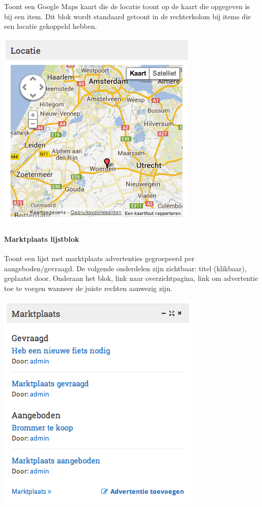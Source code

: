 Toont een Google Maps kaart die de locatie toont op de kaart die opgegeven is bij een item. Dit blok wordt standaard getoont in de rechterkolom bij items die een locatie gekoppeld hebben.

\begin{center}
	\includegraphics[scale=0.5]{img/blokken/googlemaps.png}
\end{center}

\paragraph{Marktplaats lijstblok}

Toont een lijst met marktplaats advertenties gegroepeerd per aangeboden/gevraagd. De volgende onderdelen zijn zichtbaar: titel (klikbaar), geplaatst door. Onderaan het blok, link naar overzichtpagina, link om advertentie toe te voegen wanneer de juiste rechten aanwezig zijn.

\begin{center}
	\includegraphics[scale=0.5]{img/blokken/marktplaatslijst.png}
\end{center}

